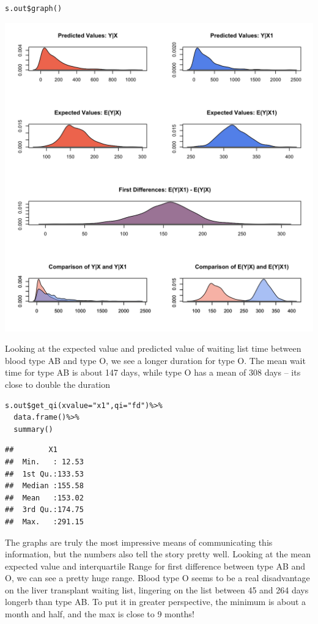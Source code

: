 \documentclass[
]{article}
\begin{document}
\begin{verbatim}
s.out$graph()
\end{verbatim}

\includegraphics{plot.png}

Looking at the expected value and predicted value of waiting list time
between blood type AB and type O, we see a longer duration for type O.
The mean wait time for type AB is about 147 days, while type O has a
mean of 308 days -- it\textquotesingle s close to double the duration

\begin{verbatim}
s.out$get_qi(xvalue="x1",qi="fd")%>%
  data.frame()%>%
  summary()
\end{verbatim}

\begin{verbatim}
##        X1        
##  Min.   : 12.53  
##  1st Qu.:133.53  
##  Median :155.58  
##  Mean   :153.02  
##  3rd Qu.:174.75  
##  Max.   :291.15
\end{verbatim}

The graphs are truly the most impressive means of communicating this
information, but the numbers also tell the story pretty well. Looking at
the mean expected value and interquartile Range for first difference
between type AB and O, we can see a pretty huge range. Blood type O
seems to be a real disadvantage on the liver transplant waiting list,
lingering on the list between 45 and 264 days longerb than type AB. To
put it in greater perspective, the minimum is about a month and half,
and the max is close to 9 months!
\end{document}
